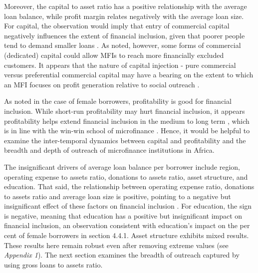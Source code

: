 \documentclass[a4paper, nobind]{templates/ociamthesis}
\begin{document}
Moreover, the capital to asset ratio has a positive relationship with the average loan balance, while profit margin relates negatively with the average loan size. For capital, the observation would imply that entry of commercial capital negatively influences the extent of financial inclusion, given that poorer people tend to demand smaller loans \autocite{mersland2010microfinance}. As noted, however, some forms of commercial (dedicated) capital could allow MFIs to reach more financially excluded customers. It appears that the nature of capital injection - pure commercial versus preferential commercial capital may have a bearing on the extent to which an MFI focuses on profit generation relative to social outreach \autocite{d2013unsubsidized}.

As noted in the case of female borrowers, profitability is good for financial inclusion. While short-run profitability may hurt financial inclusion, it appears profitability helps extend financial inclusion in the medium to long term \autocite{louis2013financial,quayes2012depth}, which is in line with the win-win school of microfinance \autocite{kodongo2013individual}. Hence, it would be helpful to examine the inter-temporal dynamics between capital and profitability and the breadth and depth of outreach of microfinance institutions in Africa.

The insignificant drivers of average loan balance per borrower include region, operating expense to assets ratio, donations to assets ratio, asset structure, and education. That said, the relationship between operating expense ratio, donations to assets ratio and average loan size is positive, pointing to a negative but insignificant effect of these factors on financial inclusion \autocite{d2017ngos}. For education, the sign is negative, meaning that education has a positive but insignificant impact on financial inclusion, an observation consistent with education's impact on the per cent of female borrowers in section 4.4.1. Asset structure exhibits mixed results. These results here remain robust even after removing extreme values (see \emph{Appendix 1}). The next section examines the breadth of outreach captured by using gross loans to assets ratio.
\end{document}
